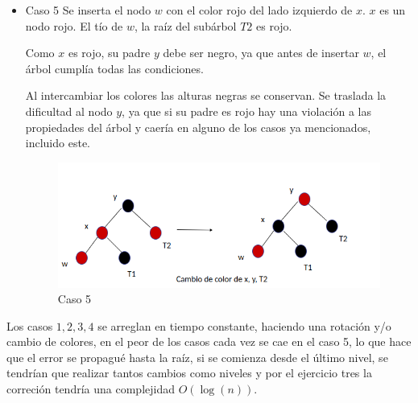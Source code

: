 \documentclass[11pt]{article}
\begin{document}
\begin{itemize}
\begin{itemize}
\item Caso 5
Se inserta el nodo $w$ con el color rojo del lado izquierdo de $x$. $x$ es un nodo rojo. El tío de $w$, la raíz del subárbol $T2$ es rojo.

Como $x$ es rojo, su padre $y$ debe ser negro, ya que antes de insertar $w$, el árbol cumplía todas las condiciones.

Al intercambiar los colores las alturas negras se conservan. Se traslada la dificultad al nodo $y$, ya que si su padre es rojo hay una violación a las propiedades del árbol y caería en alguno de los casos ya mencionados, incluido este.
\begin{figure}[H]
\begin{center}
\includegraphics[scale=0.5]{caso5.png}
\caption{Caso 5}
\end{center}
\end{figure}
\end{itemize}
Los casos $1,2,3,4$ se arreglan en tiempo constante, haciendo una rotación y/o cambio de colores, en el peor de los casos cada vez se cae en el caso 5, lo que hace que el error se propagué hasta la raíz, si se comienza desde el último nivel, se tendrían que realizar tantos cambios como niveles y por el ejercicio tres la correción tendría una complejidad $O(\log(n))$.

\end{itemize}
\end{document}
